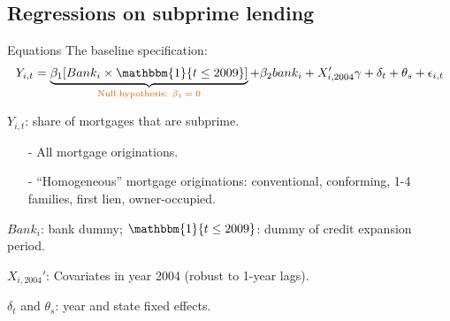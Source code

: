 \documentclass[notes,11pt, aspectratio=169]{beamer}
\newenvironment{wideitemize}{\itemize\addtolength{\itemsep}{10pt}}{\enditemize}  %
\begin{document}
\subsection*{Regressions on subprime lending}

\begin{frame}{Equations}
The baseline specification: 
\begin{equation*}
    Y_{i,t} = \underbrace{\beta_1 [ Bank_i \times \mathbbm{1}\{ t \leq 2009 \} ]}_{\text{\textcolor{red}{Null hypothesis: $\beta_1=0$}}} + \beta_2 bank_i + X_{i, 2004}' \gamma + \delta_t + \theta_s + \epsilon_{i,t}
\end{equation*}

\begin{wideitemize}
    \item <1-> $Y_{i,t}$: share of mortgages that are subprime. 
    \begin{itemize}
        \item [-] All mortgage originations.
        \item [-] ``Homogeneous'' mortgage originations: conventional, conforming, 1-4 families, first lien, owner-occupied.
    \end{itemize}
    
    \item <2-> $Bank_i$: bank dummy; $\mathbbm{1}\{ t \leq 2009 \}$: dummy of credit expansion period. 
    
    \item <3> $X_{i, 2004}'$: Covariates in year 2004 (robust to 1-year lags).
    
    \item <3> $\delta_t$ and $\theta_s$: year and state fixed effects.
\end{wideitemize}
\end{frame}
\end{document}
